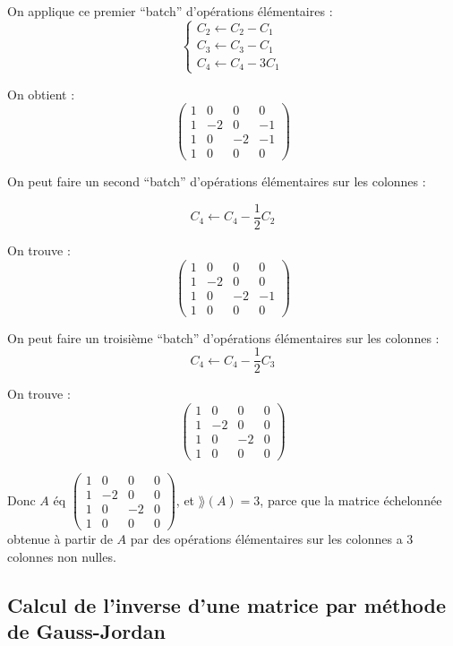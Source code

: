 \documentclass[12pt, a4paper]{report}
\begin{document}
On applique ce premier ``batch'' d'opérations élémentaires :
$$\begin{cases}
    C_2 \leftarrow C_2 - C_1 \\
    C_3 \leftarrow C_3 - C_1 \\
    C_4 \leftarrow C_4 - 3C_1
\end{cases}$$

On obtient :
$$\left(\begin{matrix}
    1 & 0 & 0 & 0 \\
    1 & -2 & 0 & -1 \\
    1 & 0 & -2 & -1 \\
    1 & 0 & 0 & 0
\end{matrix}\right)$$

On peut faire un second ``batch'' d'opérations élémentaires sur les colonnes :

$$C_4 \leftarrow C_4 - \frac12 C_2$$

On trouve :
$$\left(\begin{matrix}
    1 & 0 & 0 & 0 \\
    1 & -2 & 0 & 0 \\
    1 & 0 & -2 & -1 \\
    1 & 0 & 0 & 0
\end{matrix}\right)$$

On peut faire un troisième ``batch'' d'opérations élémentaires sur les colonnes :
$$C_4 \leftarrow C_4 - \frac12 C_3$$

On trouve :
$$\left(\begin{matrix}
    1 & 0 & 0 & 0 \\
    1 & -2 & 0 & 0 \\
    1 & 0 & -2 & 0 \\
    1 & 0 & 0 & 0
\end{matrix}\right)$$

Donc $A$ éq $\left(\begin{matrix}
    1 & 0 & 0 & 0 \\
    1 & -2 & 0 & 0 \\
    1 & 0 & -2 & 0 \\
    1 & 0 & 0 & 0
\end{matrix}\right)$, et $\rang(A) = 3$, parce que la matrice échelonnée obtenue à partir de $A$ par des opérations élémentaires sur les colonnes a 3 colonnes non nulles.

\subsection{Calcul de l'inverse d'une matrice par méthode de Gauss-Jordan}
\end{document}
